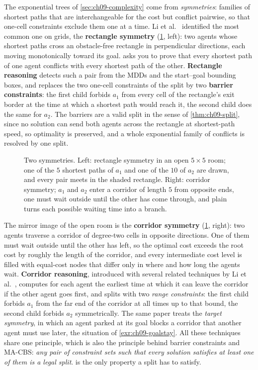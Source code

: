 The exponential trees of \cref{sec:ch09-complexity} come from
\emph{symmetries}: families of shortest paths that are interchangeable for
the cost but conflict pairwise, so that one-cell constraints exclude them
one at a time. Li et al.~\cite{li2019symmetry} identified the most common
one on grids, the \textbf{rectangle symmetry}
(\cref{fig:ch09-symmetry}, left): two agents whose shortest paths cross an
obstacle-free rectangle in perpendicular directions, each moving
monotonically toward its goal.  asks you to prove
that every shortest path of one agent conflicts with every shortest path of
the other. \textbf{Rectangle reasoning} detects such a pair from the MDDs
and the start--goal bounding boxes, and replaces the two one-cell
constraints of the split by two \textbf{barrier constraints}: the first
child forbids $a_1$ from every cell of the rectangle's exit border at the
time at which a shortest path would reach it, the second child does the
same for $a_2$. The barriers are a valid split in the sense of
\cref{thm:ch09-split}, since no solution can send both agents across the
rectangle at shortest-path speed, so optimality is preserved, and a whole
exponential family of conflicts is resolved by one split.

\begin{figure}[tb]
  \centering
  \caption{Two symmetries. Left: rectangle symmetry in an open $5 \times 5$
    room; one of the $5$ shortest paths of $a_1$ and one of the $10$ of
    $a_2$ are drawn, and every pair meets in the shaded rectangle. Right:
    corridor symmetry; $a_1$ and $a_2$ enter a corridor of length $5$ from
    opposite ends, one must wait outside until the other has come through,
    and plain \cbs turns each possible waiting time into a branch.}
  \label{fig:ch09-symmetry}
\end{figure}

The mirror image of the open room is the \textbf{corridor
symmetry} (\cref{fig:ch09-symmetry}, right): two
agents traverse a corridor of degree-two cells in opposite directions. One
of them must wait outside until the other has left, so the optimal cost
exceeds the root cost by roughly the length of the corridor, and every
intermediate cost level is filled with equal-cost nodes that differ only in
where and how long the agents wait. \textbf{Corridor reasoning}, introduced
with several related techniques by Li et al.~\cite{li2020pairwise}, computes
for each agent the earliest time at which it can leave the corridor if the
other agent goes first, and splits with two \emph{range constraints}: the
first child forbids $a_1$ from the far end of the corridor at all times up
to that bound, the second child forbids $a_2$ symmetrically. The same paper
treats the \emph{target symmetry}, in which an agent parked at its goal
blocks a corridor that another agent must use later, the situation of
\cref{exr:ch09-goalstay}. All these techniques share one principle, which
is also the principle behind barrier constraints and MA-CBS: \emph{any pair
of constraint sets such that every solution satisfies at least one of them
is a legal split}.  is the only property a split has to
satisfy.

